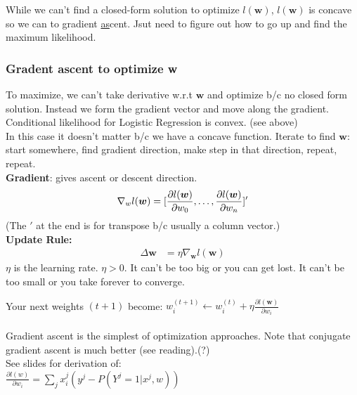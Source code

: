 While we can't find a closed-form solution to optimize $l(\bm{w})$,  $l(\bm{w})$ is concave so we can to gradient \underline{as}cent. 
Jsut need to figure out how to go up and find the maximum likelihood.   %

\subsubsection{Gradent ascent to optimize w}
To maximize, we can't take derivative w.r.t $\bm{w}$ and optimize b/c no closed form solution.  %
Instead we form the gradient vector and move along the gradient. %
Conditional likelihood for Logistic Regression is convex.  (see above)  \hfill \\
In this case it doesn't matter b/c we have a concave function.  %
Iterate to find $\bm{w}$: start somewhere, find gradient direction, make step in that direction, repeat, repeat.
\hfill \\

\textbf{Gradient}:  gives ascent or descent direction. \hfill \\
\begin{align*}
	\nabla_w l(\bm{w}) = [\frac{\partial l(\bm{w})}{\partial w_0}, \dots, \frac{\partial l(\bm{w})}{\partial w_n}]'  \hfill \\
\end{align*}
	(The $'$ at the end is for transpose b/c usually a column vector.)  \hfill \\
\textbf{Update Rule:} \hfill \\
\begin{align*}
	\Delta \bm{w} &= \eta \nabla_{\bm{w}} l(\bm{w})
\end{align*}
$\eta$ is the learning rate.  $\eta > 0$.  
	It can't be too big or you can get lost.  
	It can't be too small or you take forever to converge. 

Your next weights $(t+1)$ become: 
$w_i^{(t+1)} \leftarrow w_i^{(t)} + \eta \frac{\partial l(\bm{w})}{\partial w_i}$   \hfill \\
\hfill \\
Gradient ascent is the simplest  of optimization approaches.  
Note that conjugate gradient ascent is much better (see reading).(?)  \hfill \\

See slides for derivation of: \hfill \\
$\displaystyle \frac{\partial l(w)}{\partial w_i} = \sum_j x_i^j (y^j - P(Y^j = 1 | x^j, w))$

